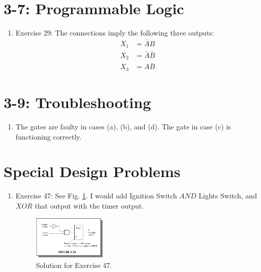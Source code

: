 \documentclass[10pt]{article}
\begin{document}
\section{3-7: Programmable Logic}

\begin{enumerate}
\item Exercise 29: The connections imply the following three outputs:
\begin{align}
X_1 &= \bar{A}B \\
X_2 &= \bar{A}\bar{B} \\ 
X_3 &= A\bar{B}
\end{align}
\end{enumerate}

\section{3-9: Troubleshooting}

\begin{enumerate}
\item The gates are faulty in cases (a), (b), and (d).  The gate in case (c) is functioning correctly.
\end{enumerate}

\clearpage

\section{Special Design Problems}

\begin{enumerate}
\item Exercise 47: See Fig. \ref{fig:special}.  I would add Ignition Switch $AND$ Lights Switch, and $XOR$ that output with the timer output.
\begin{figure}[ht]
\centering
\includegraphics[width=0.33\textwidth]{figures/special.png}
\caption{\label{fig:special} Solution for Exercise 47.}
\end{figure}
\end{enumerate}
\end{document}
